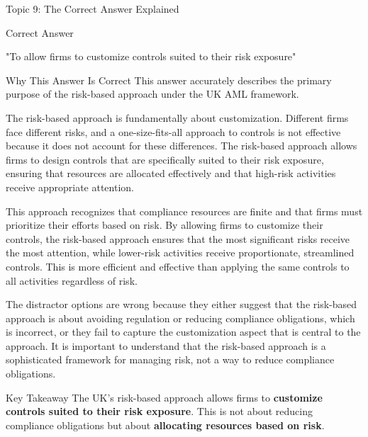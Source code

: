 \documentclass[8pt]{beamer}  %
\newcommand{\correct}{\textcolor{correctgreen}{\ding{51}}}
\begin{document}
	\begin{frame}{Topic 9: The Correct Answer Explained}
		\begin{block}{\large \correct \textcolor{correctgreen}{Correct Answer}}
			\begin{center}
				\Large "To allow firms to customize controls suited to their risk exposure"
			\end{center}
		\end{block}
		
		\vspace{0.2cm}
		\begin{block}{\large Why This Answer Is Correct}
			This answer accurately describes the primary purpose of the risk-based approach under the UK AML framework.
			
			The risk-based approach is fundamentally about customization. Different firms face different risks, and a one-size-fits-all approach to controls is not effective because it does not account for these differences. The risk-based approach allows firms to design controls that are specifically suited to their risk exposure, ensuring that resources are allocated effectively and that high-risk activities receive appropriate attention.
			
			This approach recognizes that compliance resources are finite and that firms must prioritize their efforts based on risk. By allowing firms to customize their controls, the risk-based approach ensures that the most significant risks receive the most attention, while lower-risk activities receive proportionate, streamlined controls. This is more efficient and effective than applying the same controls to all activities regardless of risk.
			
			The distractor options are wrong because they either suggest that the risk-based approach is about avoiding regulation or reducing compliance obligations, which is incorrect, or they fail to capture the customization aspect that is central to the approach. It is important to understand that the risk-based approach is a sophisticated framework for managing risk, not a way to reduce compliance obligations.
		\end{block}
		
		\begin{alertblock}{Key Takeaway}
			The UK's risk-based approach allows firms to \textbf{customize controls suited to their risk exposure}. This is not about reducing compliance obligations but about \textbf{allocating resources based on risk}.
		\end{alertblock}
	\end{frame}
	
\end{document}

